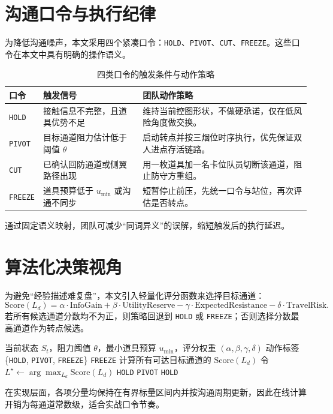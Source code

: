 \documentclass[runningheads]{llncs}
\begin{document}
\section{沟通口令与执行纪律}
为降低沟通噪声，本文采用四个紧凑口令：\texttt{HOLD}、\texttt{PIVOT}、\texttt{CUT}、\texttt{FREEZE}。这些口令在本文中具有明确的操作语义。
\begin{table}[t]
\centering
\caption{四类口令的触发条件与动作策略}
\begin{tabular}{p{1.8cm}p{2.9cm}p{5.6cm}}
\toprule
口令 & 触发信号 & 团队动作策略 \\
\midrule
\texttt{HOLD} & 接触信息不完整，且道具优势不足 & 维持当前控图形状，不做硬承诺，仅在低风险角度做交换。 \\
\texttt{PIVOT} & 目标通道阻力估计低于阈值 $\theta$ & 启动转点并按三烟位时序执行，优先保证双人进点存活链路。 \\
\texttt{CUT} & 已确认回防通道或侧翼路径出现 & 用一枚道具加一名卡位队员切断该通道，阻止防守方重组。 \\
\texttt{FREEZE} & 道具预算低于 $u_{\min}$ 或沟通不同步 & 短暂停止前压，先统一口令与站位，再次评估是否转点。 \\
\bottomrule
\end{tabular}
\end{table}
通过固定语义映射，团队可减少“同词异义”的误解，缩短触发后的执行延迟。

\section{算法化决策视角}
为避免“经验描述难复盘”，本文引入轻量化评分函数来选择目标通道：
\[
\mathrm{Score}(L_d) = \alpha \cdot \mathrm{InfoGain}
 + \beta \cdot \mathrm{UtilityReserve}
 - \gamma \cdot \mathrm{ExpectedResistance}
 - \delta \cdot \mathrm{TravelRisk}.
\]
若所有候选通道分数均不为正，则策略回退到 \texttt{HOLD} 或 \texttt{FREEZE}；否则选择分数最高通道作为转点候选。

\begin{algorithm}[H]
\caption{莲华古城转点判定过程}
\begin{algorithmic}[1]
\Require 当前状态 $S_t$，阻力阈值 $\theta$，最小道具预算 $u_{\min}$，评分权重 $(\alpha,\beta,\gamma,\delta)$
\Ensure 动作标签 \{\texttt{HOLD}, \texttt{PIVOT}, \texttt{FREEZE}\}
  \State \Return \texttt{FREEZE}
\EndIf
\State 计算所有可达目标通道的 $\mathrm{Score}(L_d)$
\State 令 $L^\star \gets \arg\max_{L_d}\mathrm{Score}(L_d)$
  \State \Return \texttt{HOLD}
\EndIf
{}
  \State \Return \texttt{PIVOT}
\Else
  \State \Return \texttt{HOLD}
\EndIf
\end{algorithmic}
\end{algorithm}
在实现层面，各项分量均保持在有界标量区间内并按沟通周期更新，因此在线计算开销为每通道常数级，适合实战口令节奏。
\end{document}
